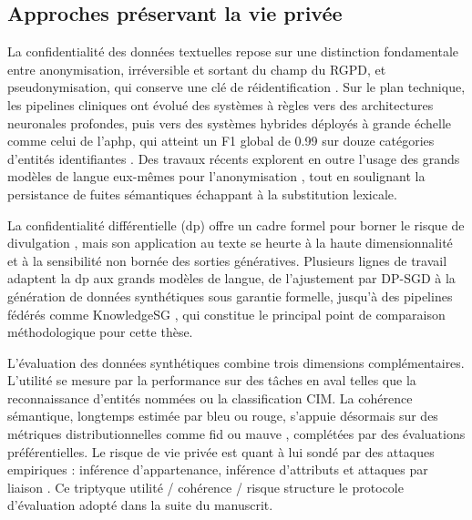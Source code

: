 \subsection{Approches préservant la vie privée}

La confidentialité des données textuelles repose sur une distinction fondamentale entre anonymisation, irréversible et sortant du champ du RGPD, et pseudonymisation, qui conserve une clé de réidentification \citep{gdpr2016}.
Sur le plan technique, les pipelines cliniques ont évolué des systèmes à règles vers des architectures neuronales profondes, puis vers des systèmes hybrides déployés à grande échelle comme celui de l'\gls{aphp}, qui atteint un F1 global de \num{0.99} sur douze catégories d'entités identifiantes \citep{tannier2024aphp}.
Des travaux récents explorent en outre l'usage des grands modèles de langue eux-mêmes pour l'anonymisation \citep{staabLargeLanguageModels2025}, tout en soulignant la persistance de fuites sémantiques échappant à la substitution lexicale.

La confidentialité différentielle (\gls{dp}) offre un cadre formel pour borner le risque de divulgation \citep{dwork2014algorithmic}, mais son application au texte se heurte à la haute dimensionnalité et à la sensibilité non bornée des sorties génératives.
Plusieurs lignes de travail adaptent la \gls{dp} aux grands modèles de langue, de l'ajustement par DP-SGD à la génération de données synthétiques sous garantie formelle, jusqu'à des pipelines fédérés comme KnowledgeSG \citep{wangKnowledgeSGPrivacyPreservingSynthetic2024}, qui constitue le principal point de comparaison méthodologique pour cette thèse.

L'évaluation des données synthétiques combine trois dimensions complémentaires.
L'utilité se mesure par la performance sur des tâches en aval telles que la reconnaissance d'entités nommées ou la classification CIM.
La cohérence sémantique, longtemps estimée par \gls{bleu} ou \gls{rouge}, s'appuie désormais sur des métriques distributionnelles comme \gls{fid} ou \gls{mauve} \citep{pillutla2021mauve}, complétées par des évaluations préférentielles.
Le risque de vie privée est quant à lui sondé par des attaques empiriques : inférence d'appartenance, inférence d'attributs et attaques par liaison \citep{powar2023sok_linkage}.
Ce triptyque utilité / cohérence / risque structure le protocole d'évaluation adopté dans la suite du manuscrit.
